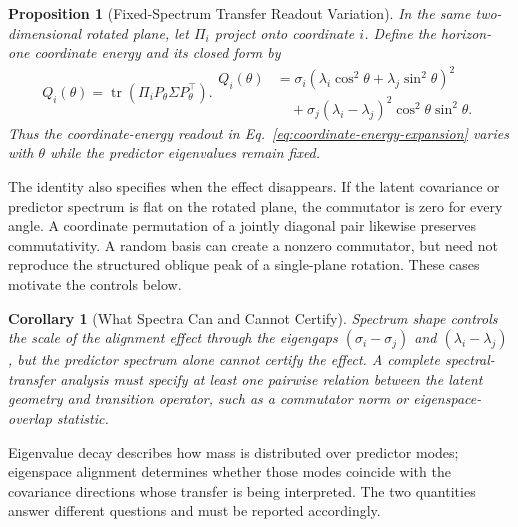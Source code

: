 \documentclass{article}
\newtheorem{proposition}{Proposition}
\newtheorem{corollary}{Corollary}
\DeclareMathOperator{\tr}{tr}
\begin{document}
\begin{proposition}[Fixed-Spectrum Transfer Readout Variation]
\label{prop:transfer-varies}
In the same two-dimensional rotated plane, let $\Pi_i$ project onto coordinate $i$. Define the horizon-one coordinate energy and its closed form by
\begin{subequations}
\label{eq:coordinate-energy}
\begin{equation}
Q_i(\theta)=\tr(\Pi_i P_\theta\Sigma P_\theta^\top).
\label{eq:coordinate-energy-definition}
\end{equation}
\begin{equation}
\begin{aligned}
Q_i(\theta)
&=
\sigma_i(\lambda_i\cos^2\theta+\lambda_j\sin^2\theta)^2\\
&\quad+
\sigma_j(\lambda_i-\lambda_j)^2\cos^2\theta\sin^2\theta .
\end{aligned}
\label{eq:coordinate-energy-expansion}
\end{equation}
\end{subequations}
Thus the coordinate-energy readout in Eq.~\eqref{eq:coordinate-energy-expansion} varies with $\theta$ while the predictor eigenvalues remain fixed.
\end{proposition}

The identity also specifies when the effect disappears. If the latent covariance or predictor spectrum is flat on the rotated plane, the commutator is zero for every angle. A coordinate permutation of a jointly diagonal pair likewise preserves commutativity. A random basis can create a nonzero commutator, but need not reproduce the structured oblique peak of a single-plane rotation. These cases motivate the controls below.

\begin{corollary}[What Spectra Can and Cannot Certify]
Spectrum shape controls the scale of the alignment effect through the eigengaps $(\sigma_i-\sigma_j)$ and $(\lambda_i-\lambda_j)$, but the predictor spectrum alone cannot certify the effect. A complete spectral-transfer analysis must specify at least one pairwise relation between the latent geometry and transition operator, such as a commutator norm or eigenspace-overlap statistic.
\end{corollary}

Eigenvalue decay describes how mass is distributed over predictor modes; eigenspace alignment determines whether those modes coincide with the covariance directions whose transfer is being interpreted. The two quantities answer different questions and must be reported accordingly.
\end{document}
